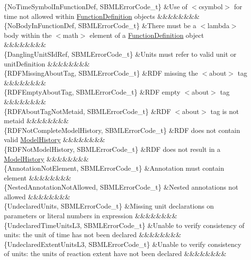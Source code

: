 \begin{DoxyParagraph}{}
\begin{longtabu}
\{No\+Time\+Symbol\+In\+Function\+Def, S\+B\+M\+L\+Error\+Code\+\_\+t\} &Use of {\ttfamily $<$csymbol$>$} for \textquotesingle{}time\textquotesingle{} not allowed within \hyperlink{class_function_definition}{Function\+Definition} objects &&&&&&&&\\
\{No\+Body\+In\+Function\+Def, S\+B\+M\+L\+Error\+Code\+\_\+t\} &There must be a {\ttfamily $<$lambda$>$} body within the {\ttfamily $<$math$>$} element of a \hyperlink{class_function_definition}{Function\+Definition} object &&&&&&&&\\
\{Dangling\+Unit\+S\+Id\+Ref, S\+B\+M\+L\+Error\+Code\+\_\+t\} &Units must refer to valid unit or unit\+Definition &&&&&&&&\\
\{R\+D\+F\+Missing\+About\+Tag, S\+B\+M\+L\+Error\+Code\+\_\+t\} &R\+DF missing the {\ttfamily $<$about$>$} tag &&&&&&&&\\
\{R\+D\+F\+Empty\+About\+Tag, S\+B\+M\+L\+Error\+Code\+\_\+t\} &R\+DF empty {\ttfamily $<$about$>$} tag &&&&&&&&\\
\{R\+D\+F\+About\+Tag\+Not\+Metaid, S\+B\+M\+L\+Error\+Code\+\_\+t\} &R\+DF {\ttfamily $<$about$>$} tag is not metaid &&&&&&&&\\
\{R\+D\+F\+Not\+Complete\+Model\+History, S\+B\+M\+L\+Error\+Code\+\_\+t\} &R\+DF does not contain valid \hyperlink{class_model_history}{Model\+History} &&&&&&&&\\
\{R\+D\+F\+Not\+Model\+History, S\+B\+M\+L\+Error\+Code\+\_\+t\} &R\+DF does not result in a \hyperlink{class_model_history}{Model\+History} &&&&&&&&\\
\{Annotation\+Not\+Element, S\+B\+M\+L\+Error\+Code\+\_\+t\} &Annotation must contain element &&&&&&&&\\
\{Nested\+Annotation\+Not\+Allowed, S\+B\+M\+L\+Error\+Code\+\_\+t\} &Nested annotations not allowed &&&&&&&&\\
\{Undeclared\+Units, S\+B\+M\+L\+Error\+Code\+\_\+t\} &Missing unit declarations on parameters or literal numbers in expression &&&&&&&&\\
\{Undeclared\+Time\+Units\+L3, S\+B\+M\+L\+Error\+Code\+\_\+t\} &Unable to verify consistency of units\+: the unit of time has not been declared &&&&&&&&\\
\{Undeclared\+Extent\+Units\+L3, S\+B\+M\+L\+Error\+Code\+\_\+t\} &Unable to verify consistency of units\+: the units of reaction extent have not been declared &&&&&&&&\\

\end{longtabu}
\end{DoxyParagraph}
